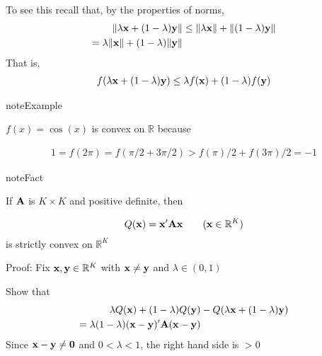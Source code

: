 \documentclass[letterpaper,10pt,english]{jupyterBook}
\begin{document}
\sphinxAtStartPar
To see this recall that, by the properties of norms,
\begin{equation*}
\begin{split}
%
\|\lambda {\bf x} + (1 - \lambda) {\bf y}\|
& \leq \|\lambda {\bf x}\| + \|(1 - \lambda) {\bf y}\|
\\
= \lambda \|{\bf x}\| + (1 - \lambda) \|{\bf y}\|
%
\end{split}
\end{equation*}
\sphinxAtStartPar
That is,
\begin{equation*}
\begin{split}
%
f(\lambda {\bf x} + (1 - \lambda) {\bf y})
\leq 
\lambda f({\bf x}) + (1 - \lambda) f({\bf y})
%
\end{split}
\end{equation*}
\begin{sphinxadmonition}{note}{Example}

\sphinxAtStartPar
\(f(x) = \cos(x)\) is  convex on \(\mathbb{R}\) because
\end{sphinxadmonition}
\begin{equation*}
\begin{split}
%
1 = f(2\pi) = f(\pi/2 + 3\pi/2) > f(\pi)/2 + f(3\pi)/2 = -1
%
\end{split}
\end{equation*}
\begin{sphinxadmonition}{note}{Fact}

\sphinxAtStartPar
If \({\bf A}\) is \(K \times K\) and positive definite, then
\end{sphinxadmonition}
\begin{equation*}
\begin{split}
%
Q({\bf x}) = {\bf x}' {\bf A} {\bf x}
\qquad ({\bf x} \in \mathbb{R}^K)
%
\end{split}
\end{equation*}
\sphinxAtStartPar
is strictly convex on \(\mathbb{R}^K\)

\sphinxAtStartPar
Proof: Fix \({\bf x}, {\bf y} \in \mathbb{R}^K\) with \({\bf x} \ne {\bf y}\) and \(\lambda \in (0, 1)\)

\sphinxAtStartPar
{} Show that
\begin{equation*}
\begin{split}
%
\lambda Q({\bf x}) + (1 - \lambda) Q({\bf y})
& - Q(\lambda {\bf x} + (1 - \lambda) {\bf y})
\\
= \lambda (1 - \lambda) ({\bf x} - {\bf y})' {\bf A} ({\bf x} - {\bf y})
%
\end{split}
\end{equation*}
\sphinxAtStartPar
Since \({\bf x} - {\bf y} \ne {\bf 0}\) and \(0 < \lambda < 1\), the right
hand side is \(> 0\)
\end{document}

